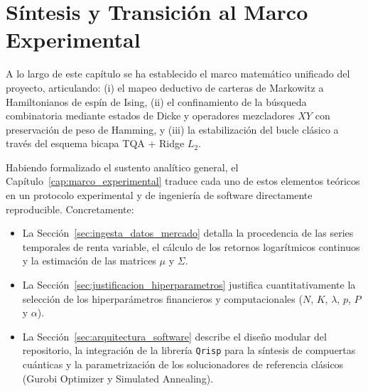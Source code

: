 \section{Síntesis y Transición al Marco Experimental}
\label{sec:sintesis_marco_teorico}

A lo largo de este capítulo se ha establecido el marco matemático unificado del proyecto, articulando: (i) el mapeo deductivo de carteras de Markowitz a Hamiltonianos de espín de Ising, (ii) el confinamiento de la búsqueda combinatoria mediante estados de Dicke y operadores mezcladores $XY$ con preservación de peso de Hamming, y (iii) la estabilización del bucle clásico a través del esquema bicapa TQA + Ridge $L_2$.

Habiendo formalizado el sustento analítico general, el Capítulo~\ref{cap:marco_experimental} traduce cada uno de estos elementos teóricos en un protocolo experimental y de ingeniería de software directamente reproducible. Concretamente:
\begin{itemize}
    \item La Sección~\ref{sec:ingesta_datos_mercado} detalla la procedencia de las series temporales de renta variable, el cálculo de los retornos logarítmicos continuos y la estimación de las matrices $\mu$ y $\Sigma$.
    \item La Sección~\ref{sec:justificacion_hiperparametros} justifica cuantitativamente la selección de los hiperparámetros financieros y computacionales ($N$, $K$, $\lambda$, $p$, $P$ y $\alpha$).
    \item La Sección~\ref{sec:arquitectura_software} describe el diseño modular del repositorio, la integración de la librería \texttt{Qrisp} para la síntesis de compuertas cuánticas y la parametrización de los solucionadores de referencia clásicos (Gurobi Optimizer y Simulated Annealing).
\end{itemize}
